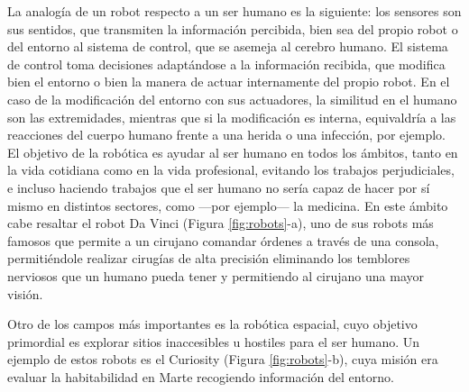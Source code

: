 La analogía de un robot respecto a un ser humano es la siguiente: los sensores son sus sentidos, que transmiten la información percibida, bien sea del propio robot o del entorno al sistema de control, que se asemeja al cerebro humano. El sistema de control toma decisiones adaptándose a la información recibida, que modifica bien el entorno o bien la manera de actuar internamente del propio robot. En el caso de la modificación del entorno con sus actuadores, la similitud en el humano son las extremidades, mientras que si la modificación es interna, equivaldría a las reacciones del cuerpo humano frente a una herida o una infección, por ejemplo.\\


El objetivo de la robótica es ayudar al ser humano en todos los ámbitos, tanto en la vida cotidiana como en la vida profesional, evitando los trabajos perjudiciales, e incluso haciendo trabajos que el ser humano no sería capaz de hacer por sí mismo en distintos sectores, como ---por ejemplo--- la medicina. En este ámbito cabe resaltar el robot Da Vinci (Figura \ref{fig:robots}-a), uno de sus robots más famosos que permite a un cirujano comandar órdenes a través de una consola, permitiéndole realizar cirugías de alta precisión eliminando los temblores nerviosos que un humano pueda tener y permitiendo al cirujano una mayor visión.

Otro de los campos más importantes es la robótica espacial, cuyo objetivo primordial es explorar sitios inaccesibles u hostiles para el ser humano. Un ejemplo de estos robots es el Curiosity (Figura \ref{fig:robots}-b), cuya misión era evaluar la habitabilidad en Marte recogiendo información del entorno.


